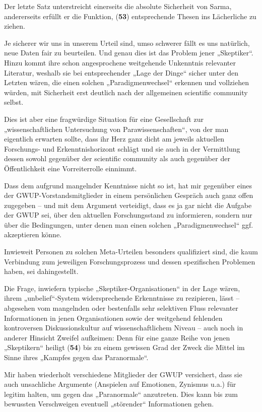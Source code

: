 Der letzte Satz unterstreicht einerseits die absolute Sicherheit von
Sarma, andererseits erfüllt er die Funktion, (\textbf{53}) entsprechende
Thesen ins Lächerliche zu ziehen.

Je sicherer wir uns in unserem Urteil sind, umso schwerer fällt es uns
natürlich, neue Daten fair zu beurteilen. Und genau dies ist das Problem
jener „Skeptiker``. Hinzu kommt ihre schon angesprochene weitgehende
Unkenntnis relevanter Literatur, weshalb sie bei entsprechender „Lage
der Dinge`` sicher unter den Letzten wären, die einen solchen
„Paradigmenwechsel`` erkennen und vollziehen würden, mit Sicherheit erst
deutlich nach der allgemeinen scientific community selbst.

Dies ist aber eine fragwürdige Situation für eine Gesellschaft zur
„wissenschaftlichen Untersuchung von Parawissenschaften``, von der man
eigentlich erwarten sollte, dass ihr Herz ganz dicht am jeweils
aktuellen Forschungs- und Erkenntnishorizont schlägt und sie auch in der
Vermittlung dessen sowohl gegenüber der scientific community als auch
gegenüber der Öffentlichkeit eine Vorreiterrolle einnimmt.

Dass dem aufgrund mangelnder Kenntnisse nicht so ist, hat mir gegenüber
eines der GWUP-Vorstandsmitglieder in einem persönlichen Gespräch auch
ganz offen zugegeben -- und mit dem Argument verteidigt, dass es ja gar
nicht die Aufgabe der GWUP sei, über den aktuellen Forschungsstand zu
informieren, sondern nur über die Bedingungen, unter denen man einen
solchen „Paradigmenwechsel`` ggf. akzeptieren könne.

Inwieweit Personen zu solchen Meta-Urteilen besonders qualifiziert sind,
die kaum Verbindung zum jeweiligen Forschungsprozess und dessen
spezifischen Problemen haben, sei dahingestellt.

Die Frage, inwiefern typische „Skeptiker-Organisationen`` in der Lage
wären, ihrem „unbelief``-System widersprechende Erkenntnisse zu
rezipieren, lässt -- abgesehen vom mangelnden oder bestenfalls sehr
selektiven Fluss relevanter Informationen in jenen Organisationen sowie
der weitgehend fehlenden kontroversen Diskussionskultur auf
wissenschaftlichem Niveau -- auch noch in anderer Hinsicht Zweifel
aufkeimen: Denn für eine ganze Reihe von jenen „Skeptikern`` heiligt
(\textbf{54}) bis zu einem gewissen Grad der Zweck die Mittel im Sinne
ihres „Kampfes gegen das Paranormale``.

Mir haben wiederholt verschiedene Mitglieder der GWUP versichert, dass
sie auch unsachliche Argumente (Anspielen auf Emotionen, Zynismus u.a.)
für legitim halten, um gegen das „Paranormale`` anzutreten. Dies kann
bis zum bewussten Verschweigen eventuell „störender`` Informationen
gehen.

